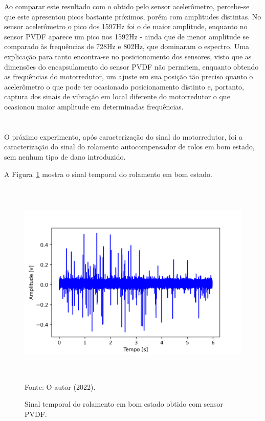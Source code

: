 \documentclass[
	12pt,				
	oneside,			
	a4paper,			
	english,			
	brazil,	
	sumario=abnt-6027-2012		
	]{abntex2ppgsi}
\begin{document}
{{{{{{{{{{{%
Ao comparar este resultado com o obtido pelo sensor acelerômetro, percebe-se que este apresentou picos bastante próximos, porém com amplitudes distintas. No sensor acelerômetro o pico dos 1597Hz foi o de maior amplitude, enquanto no sensor PVDF aparece um pico nos 1592Hz - ainda que de menor amplitude se comparado às frequências de 728Hz e 802Hz, que dominaram o espectro. Uma explicação para tanto encontra-se no posicionamento dos sensores, visto que as dimensões do encapsulamento do sensor PVDF não permitem, enquanto obtendo as frequências do motorredutor, um ajuste em sua posição tão preciso quanto o acelerômetro o que pode ter ocasionado posicionamento distinto e, portanto, captura dos sinais de vibração em local diferente do motorredutor o que ocasionou maior amplitude em determinadas frequências. 


\section{}

O próximo experimento, após caracterização do sinal do motorredutor, foi a caracterização do sinal do rolamento autocompensador de rolos em bom estado, sem nenhum tipo de dano introduzido. 

A Figura~\ref{DOMINIO_TEMPO_ROLAMENTO_BOM} mostra o sinal temporal do rolamento em bom estado. 

\begin{figure}[H]
\centering
\caption {Sinal temporal do rolamento em bom estado obtido com sensor PVDF.}
\includegraphics[width=\textwidth,height=100mm,keepaspectratio]{aquisicao_05_rolamento_bom_10_03_2022_09h03min_ajustado_6s} \\
Fonte: O autor (2022).
\label{DOMINIO_TEMPO_ROLAMENTO_BOM}
\end{figure} 

}}}}}}}}}}}
\end{document}
